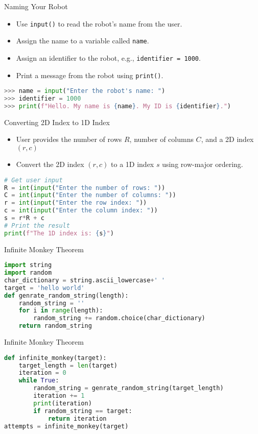 \begin{frame}[fragile]{Naming Your Robot}
    \begin{itemize}
        \item Use \texttt{input()} to read the robot's name from the user.
        \item Assign the name to a variable called \texttt{name}.
        \item Assign an identifier to the robot, e.g., \texttt{identifier = 1000}.
        \item Print a message from the robot using \texttt{print()}.
    \end{itemize}
    \begin{lstlisting}[style=colorful, language=Python]
>>> name = input("Enter the robot's name: ")
>>> identifier = 1000
>>> print(f"Hello. My name is {name}. My ID is {identifier}.")
    \end{lstlisting}
\end{frame}

\begin{frame}[fragile]{Converting 2D Index to 1D Index}
    \begin{itemize}
        \item User provides the number of rows \(R\), number of columns \(C\), and a 2D index \((r, c)\)
        \item Convert the 2D index \((r, c)\) to a 1D index \(s\) using row-major ordering.
    \end{itemize}
    \begin{lstlisting}[style=colorful, language=Python]
# Get user input
R = int(input("Enter the number of rows: "))
C = int(input("Enter the number of columns: "))
r = int(input("Enter the row index: "))
c = int(input("Enter the column index: "))
s = r*R + c
# Print the result
print(f"The 1D index is: {s}")
    \end{lstlisting}
\end{frame}

\begin{frame}[fragile]{Infinite Monkey Theorem}
\begin{lstlisting}[style=colorful, language=Python]
import string 
import random 
char_dictionary = string.ascii_lowercase+' '
target = 'hello world'
def genrate_random_string(length):
    random_string = ''
    for i in range(length):
        random_string += random.choice(char_dictionary)
    return random_string
\end{lstlisting}
\end{frame}

\begin{frame}[fragile]{Infinite Monkey Theorem}
\begin{lstlisting}[style=colorful, language=Python]
def infinite_monkey(target):
    target_length = len(target)
    iteration = 0
    while True:
        random_string = genrate_random_string(target_length)
        iteration += 1
        print(iteration)
        if random_string == target:
            return iteration
attempts = infinite_monkey(target)
\end{lstlisting}
\end{frame}